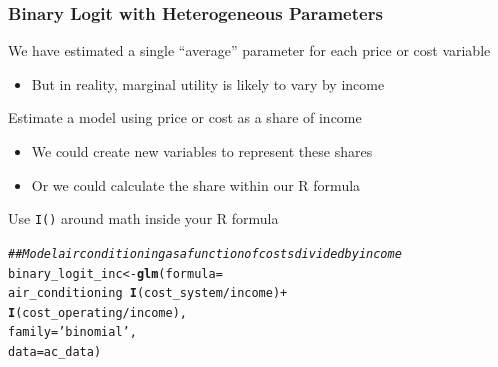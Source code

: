 \documentclass{beamer}\usepackage[]{graphicx}\usepackage[]{color}
\makeatletter
\newcommand{\hlstr}[1]{\textcolor[rgb]{0.192,0.494,0.8}{#1}}%
\newcommand{\hlcom}[1]{\textcolor[rgb]{0.678,0.584,0.686}{\textit{#1}}}%
\newcommand{\hlopt}[1]{\textcolor[rgb]{0,0,0}{#1}}%
\newcommand{\hlstd}[1]{\textcolor[rgb]{0.345,0.345,0.345}{#1}}%
\newcommand{\hlkwb}[1]{\textcolor[rgb]{0.69,0.353,0.396}{#1}}%
\newcommand{\hlkwc}[1]{\textcolor[rgb]{0.333,0.667,0.333}{#1}}%
\newcommand{\hlkwd}[1]{\textcolor[rgb]{0.737,0.353,0.396}{\textbf{#1}}}%
\newenvironment{kframe}{%
 \def\at@end@of@kframe{}%
 \ifinner\ifhmode%
  \def\at@end@of@kframe{\end{minipage}}%
  \begin{minipage}{\columnwidth}%
 \fi\fi%
 \def\FrameCommand##1{\hskip\@totalleftmargin \hskip-\fboxsep
 \colorbox{shadecolor}{##1}\hskip-\fboxsep
     \hskip-\linewidth \hskip-\@totalleftmargin \hskip\columnwidth}%
 \MakeFramed {\advance\hsize-\width
   \@totalleftmargin\z@ \linewidth\hsize
   \@setminipage}}%
 {\par\unskip\endMakeFramed%
 \at@end@of@kframe}
\newenvironment{knitrout}{}{} %
\makeatother
\begin{document}
\begin{frame}[fragile]\frametitle{Binary Logit with Heterogeneous Parameters}
    We have estimated a single ``average'' parameter for each price or cost variable
    \begin{itemize}
        \item But in reality, marginal utility is likely to vary by income
    \end{itemize}
    \vspace{2ex}
    Estimate a model using price or cost as a share of income
    \begin{itemize}
        \item We could create new variables to represent these shares
        \item Or we could calculate the share within our R formula
    \end{itemize}
    \vspace{2ex}
    Use \texttt{I()} around math inside your R formula
\begin{knitrout}\footnotesize
{}\color{fgcolor}\begin{kframe}
\begin{alltt}
\hlcom{## Model air conditioning as a function of costs divided by income}
\hlstd{binary_logit_inc} \hlkwb{<-} \hlkwd{glm}\hlstd{(}\hlkwc{formula} \hlstd{=}
                          \hlstd{air_conditioning} \hlopt{~} \hlkwd{I}\hlstd{(cost_system} \hlopt{/} \hlstd{income)} \hlopt{+}
                          \hlkwd{I}\hlstd{(cost_operating} \hlopt{/} \hlstd{income),}
                        \hlkwc{family} \hlstd{=} \hlstr{'binomial'}\hlstd{,}
                        \hlkwc{data} \hlstd{= ac_data)}
\end{alltt}
\end{kframe}
\end{knitrout}
\end{frame}
\end{document}

